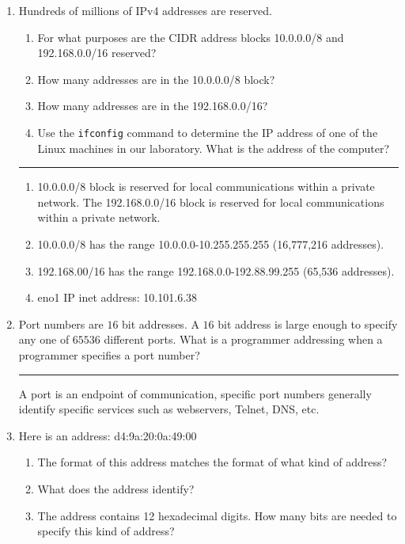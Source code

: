 \documentclass[twoside]{article}
\newenvironment{answer}
  {\vspace*{0.2cm} \rule{12cm}{0.04cm} \vspace*{0.2cm}}
  {\vspace*{0.2cm}}
\begin{document}
\begin{enumerate}
  \item Hundreds of millions of IPv4 addresses are reserved.
  \begin{enumerate}
    \item For what purposes are the CIDR address blocks 10.0.0.0/8 and 192.168.0.0/16 reserved?
    \item How many addresses are in the 10.0.0.0/8 block?
    \item How many addresses are in the 192.168.0.0/16?
    \item Use the \verb+ifconfig+ command to determine the IP address of
      one of the Linux machines in our laboratory. What is the address of the computer?
    \end{enumerate}

  \begin{answer}

  \begin{enumerate}
    \item 10.0.0.0/8 block is reserved for local communications within a private network.  The 192.168.0.0/16 block is reserved for local communications within a private network.
    \item 10.0.0.0/8 has the range 10.0.0.0-10.255.255.255 (16,777,216 addresses).
    \item 192.168.00/16 has the range 192.168.0.0-192.88.99.255 (65,536 addresses).
    \item eno1 IP  inet address: 10.101.6.38
    \end{enumerate}

    \end{answer}

  \item Port numbers are $16$ bit addresses. A $16$ bit address is large
    enough to specify any one of $65536$ different ports. What is a programmer
    addressing when a programmer specifies a port number?

  \begin{answer}
    A port is an endpoint of communication, specific port numbers generally identify specific services such as webservers, Telnet, DNS, etc.  
    \end{answer}

  \item Here is an address: d4:9a:20:0a:49:00
  \begin{enumerate}
    \item The format of this address matches the format of what kind of address?
    \item What does the address identify?
    \item The address contains 12 hexadecimal digits. How many bits are needed
      to specify this kind of address?
    \end{enumerate}
  

\end{enumerate}
\end{document}
